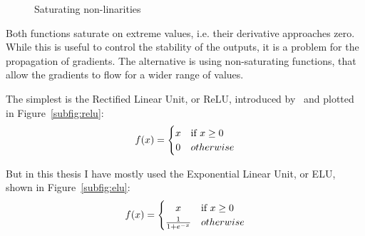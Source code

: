 \begin{figure}[tb]
	\hfil
	\caption{Saturating non-linarities}\label{fig:non_linear}
\end{figure}

Both functions saturate on extreme values, 
i.e. their derivative approaches zero.
While this is useful to control the stability of the outputs, it is a problem for the propagation of gradients.
The alternative is using non-saturating functions, that allow the gradients to flow for a wider range of values.

The simplest is the Rectified Linear Unit, or ReLU, introduced by~\citet{relu} and plotted in Figure~\ref{subfig:relu}:
\begin{equation*}
f(x) =  \begin{cases}
\hfil x &  \text{if } x \geq 0 \\
\hfil 0 & otherwise
\end{cases}
\end{equation*}

But in this thesis I have mostly used the Exponential Linear Unit, or ELU, shown in Figure~\ref{subfig:elu}:
\begin{equation*}
f(x) =  \begin{cases}
\hfil x &  \text{if } x \geq 0 \\
\frac{1}{1 + e^{-x}} & otherwise
\end{cases}
\end{equation*}

